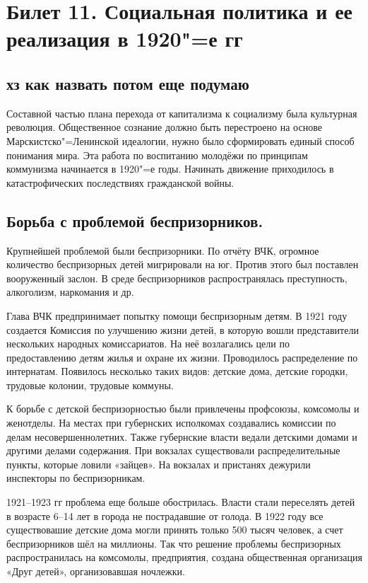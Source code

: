 \section{Билет 11. Социальная политика и ее реализация в 1920"=е гг}

\subsection{хз как назвать потом еще подумаю}

Составной частью плана перехода от капитализма к социализму была культурная революция. Общественное сознание должно быть перестроено на основе Марскистско"=Ленинской идеалогии, нужно было сформировать единый способ понимания мира. Эта работа по воспитанию молодёжи по принципам коммунизма начинается в 1920"=е годы. Начинать движение приходилось в катастрофических последствиях гражданской войны.

\subsection{Борьба с проблемой беспризорников.}

Крупнейшей проблемой были беспризорники. По отчёту ВЧК, огромное количество беспризорных детей мигрировали на юг. Против этого был поставлен вооруженный заслон. В среде беспризорников распространялась преступность, алкоголизм, наркомания и др. 

Глава ВЧК предпринимает попытку помощи беспризорным детям. В 1921 году создается Комиссия по улучшению жизни детей, в которую вошли представители нескольких народных комиссариатов. На неё возлагались цели по предоставлению детям жилья и охране их жизни. Проводилось распределение по интернатам. Появилось несколько таких видов: детские дома, детские городки, трудовые колонии, трудовые коммуны. 

К борьбе с детской беспризорностью были привлечены профсоюзы, комсомолы и женотделы. На местах при губернских исполкомах создавались комиссии по делам несовершеннолетних. Также губернские власти ведали детскими домами и другими делами содержания. При вокзалах существовали распределительные пункты, которые ловили «зайцев». На вокзалах и пристанях дежурили инспекторы по беспризорникам.

1921--1923 гг проблема еще больше обострилась. Власти стали переселять детей в возрасте 6--14 лет в города не пострадавшие от голода. В 1922 году все существовашие детские дома могли принять только 500 тысяч человек, а счет беспризорников шёл на миллионы. Так что решение проблемы беспризорных распространилась на комсомолы, предприятия, создана общественная организация «Друг детей», организовавшая ночлежки.

